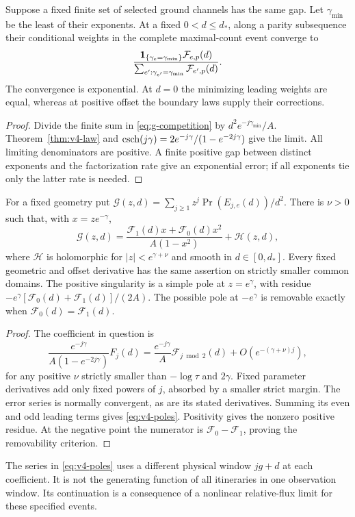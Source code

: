 \begin{corollary}\label{cor:v4-weights}
Suppose a fixed finite set of selected ground channels has the same
gap. Let $\gamma_{\min}$ be the least of their exponents. At a fixed
$0<d\le d_*$, along a parity subsequence their conditional weights in
the complete maximal-count event converge to
\[
 \frac{\mathbf1_{\{\gamma_e=\gamma_{\min}\}}\mathcal F_{e,p}(d)}
 {\sum_{e':\gamma_{e'}=\gamma_{\min}}\mathcal F_{e',p}(d)}.
\]
The convergence is exponential. At $d=0$ the minimizing leading
weights are equal, whereas at positive offset the boundary laws
supply their corrections.
\end{corollary}
\begin{proof}
Divide the finite sum in \eqref{eq:g-competition} by
$d^2e^{-j\gamma_{\min}}/A$. Theorem~\ref{thm:v4-law} and
$\operatorname{csch}(j\gamma)=2e^{-j\gamma}/(1-e^{-2j\gamma})$ give the limit.
All limiting denominators are positive. A finite positive gap between
distinct exponents and the factorization rate give an exponential
error; if all exponents tie only the latter rate is needed.
\end{proof}

\begin{corollary}\label{cor:v4-poles}
For a fixed geometry put
$\mathcal G(z,d)=\sum_{j\ge1}z^j\Pr(E_{j,e}(d))/d^2$.
There is $\nu>0$ such that, with $x=ze^{-\gamma}$,
\begin{equation}\label{eq:v4-poles}
 \mathcal G(z,d)=
 \frac{\mathcal F_1(d)x+\mathcal F_0(d)x^2}{A(1-x^2)}
                      +\mathcal H(z,d),
\end{equation}
where $\mathcal H$ is holomorphic for $|z|<e^{\gamma+\nu}$ and
smooth in $d\in[0,d_*]$. Every fixed geometric and offset derivative
has the same assertion on strictly smaller common domains.
The positive singularity is a simple pole at $z=e^\gamma$, with
residue $-e^\gamma[\mathcal F_0(d)+\mathcal F_1(d)]/(2A)$.
The possible pole at $-e^\gamma$ is removable exactly when
$\mathcal F_0(d)=\mathcal F_1(d)$.
\end{corollary}
\begin{proof}
The coefficient in question is
\[
 \frac{e^{-j\gamma}}{A(1-e^{-2j\gamma})}F_j(d)
 =\frac{e^{-j\gamma}}A\mathcal F_{j\bmod2}(d)
                       +O(e^{-(\gamma+\nu)j}),
\]
for any positive $\nu$ strictly smaller than $-\log\tau$ and
$2\gamma$. Fixed parameter derivatives add only fixed powers of $j$,
absorbed by a smaller strict margin. The error series is normally
convergent, as are its stated derivatives. Summing its even and odd
leading terms gives \eqref{eq:v4-poles}. Positivity gives the nonzero
positive residue. At the negative point the numerator is
$\mathcal F_0-\mathcal F_1$, proving the removability criterion.
\end{proof}

The series in \eqref{eq:v4-poles} uses a different physical window
$jg+d$ at each coefficient. It is not the generating function of all
itineraries in one observation window. Its continuation is a consequence
of a nonlinear relative-flux limit for these specified events.
